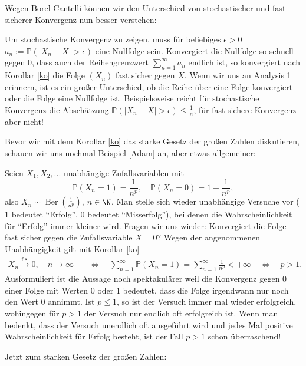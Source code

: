 Wegen Borel-Cantelli k\"onnen wir den Unterschied von stochastischer und fast sicherer Konvergenz nun besser verstehen:
\begin{bem}\label{bem4}
	Um stochastische Konvergenz zu zeigen, muss f\"ur beliebiges $\epsilon>0$ $a_n:=\mathbb P(|X_n-X|>\epsilon)$ eine Nullfolge sein. Konvergiert die Nullfolge so schnell gegen $0$, dass auch der Reihengrenzwert $\sum_{n=1}^\infty a_n$ endlich ist, so konvergiert nach Korollar \ref{ko} die Folge $(X_n)$ fast sicher gegen $X$. Wenn wir uns an Analysis 1 erinnern, ist es ein gro\ss er Unterschied, ob die Reihe \"uber eine Folge konvergiert oder die Folge eine Nullfolge ist. Beispielsweise reicht f\"ur stochastische Konvergenz die Absch\"atzung $\mathbb P(|X_n-X|>\epsilon)\leq \frac{1}{n}$, f\"ur fast sichere Konvergenz aber nicht!
\end{bem}


Bevor wir mit dem Korollar \ref{ko} das starke Gesetz der gro\ss en Zahlen diskutieren, schauen wir uns nochmal Beispiel \ref{Adam} an, aber etwas allgemeiner:
\begin{example}
Seien $X_1, X_2, ... $ unabh\"angige Zufallsvariablen mit $$\mathbb{P}(X_n = 1) = \frac{1}{n^p}, \quad \mathbb{P}(X_n = 0) = 1 - \frac{1}{n^p},$$ also $X_n \sim \operatorname{Ber}(\frac{1}{n^p})$, $n \in \N$. Man stelle sich wieder unabh\"angige Versuche vor ($1$ bedeutet \enquote{Erfolg}, $0$ bedeutet \enquote{Misserfolg}), bei denen die Wahrscheinlichkeit f\"ur \enquote{Erfolg} immer kleiner wird. Fragen wir uns wieder: Konvergiert die Folge fast sicher gegen die Zufallsvariable $X=0$? Wegen der angenommenen Unabh\"angigkeit gilt mit Korollar \ref{ko} 
\begin{align*}
	X_n\overset{\text{f.s.}}{\to} 0,\quad n\to\infty \quad &\Leftrightarrow\quad \sum_{n=1}^\infty \mathbb P(X_n=1)=\sum_{n=1}^\infty \frac{1}{n^p}<+\infty\quad
	\Leftrightarrow\quad p>1.
\end{align*}
Ausformuliert ist die Aussage noch spektakul\"arer weil die Konvergenz gegen $0$ einer Folge mit Werten $0$ oder $1$ bedeutet, dass die Folge irgendwann nur noch den Wert $0$ annimmt. Ist $p\leq 1$, so ist der Versuch immer mal wieder erfolgreich, wohingegen f\"ur $p>1$ der Versuch nur endlich oft erfolgreich ist. Wenn man bedenkt, dass der Versuch unendlich oft ausgef\"uhrt wird und jedes Mal positive Wahrscheinlichkeit f\"ur Erfolg besteht, ist der Fall $p>1$ schon \"uberraschend!
\end{example}


Jetzt zum starken Gesetz der gro\ss en Zahlen:

